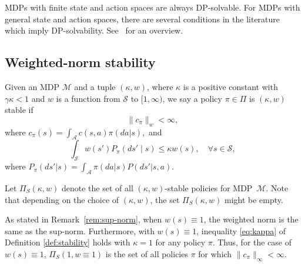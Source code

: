 \documentclass[letterpaper, 10pt]{IEEEtran}
\newcommand*\ALPHABET{\mathcal}
\newcommand*\tuple{\kappa, w}
\begin{document}
MDPs with finite state and action spaces are always DP-solvable. For MDPs with general state and action spaces, there are several conditions in the literature which imply DP-solvability. See~\cite{hernandez2012discrete} for an overview.

\subsection{Weighted-norm stability}
\begin{definition}[$(\tuple)$ stability of a policy]\label{def:stability}
   Given an MDP $\ALPHABET M$ and a tuple $(\tuple)$, where 
   $\kappa$ is a positive constant with $\gamma \kappa < 1$ and $w$ is a function from $\ALPHABET S$ to $[1, \infty)$, we say
   a policy $\pi \in \Pi$ is $(\tuple)$ stable if
   \begin{equation}\label{eq:c-pi}
        \| c_\pi \|_w < \infty,
   \end{equation}
   where $c_\pi(s) = \int_{\ALPHABET A} c(s,a) \pi(da | s),$ and 
   \begin{equation}
      \int_{\ALPHABET S} w(s') P_\pi(ds' \mid s) 
      \le 
      \kappa w(s), 
      \quad
      \forall s \in \ALPHABET S,
      \label{eq:kappa}
   \end{equation}
   where $P_\pi(ds' | s) = \int_{\ALPHABET A} \pi(da | s) P(ds' | s,a)$.
\end{definition}
Let $\Pi_S(\tuple)$ denote the set of all $(\tuple)$-stable policies for MDP~$\ALPHABET M$. 
Note that depending on the choice of $(\tuple)$, the set $\Pi_S(\tuple)$ might be empty. 
\begin{remark}
As stated in Remark~\ref{rem:sup-norm}, when $w(s) \equiv 1$, the weighted norm is the same as the sup-norm. Furthermore, with $w(s) \equiv 1$,   inequality \eqref{eq:kappa} of Definition \ref{def:stability} holds with $\kappa =1$ for any policy $\pi$. Thus, for the case of $w(s) \equiv 1$, $\Pi_S(1, w \equiv 1 )$ is the set of all policies $\pi$ for which $\| c_\pi \|_{\infty} < \infty$.
\end{remark}
\end{document}
